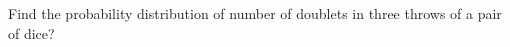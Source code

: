 \begin{flushleft}
Find the probability distribution of number of doublets in three throws of a pair of dice?
\end{flushleft}